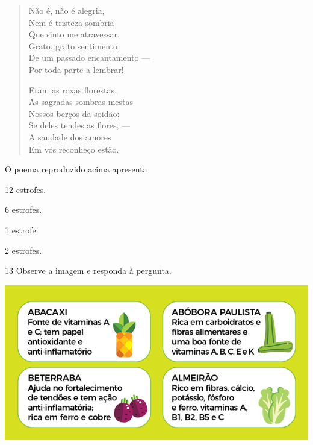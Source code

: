 \begin{myquote}
\begin{myescolha}
\begin{myquote}
\begin{verse}
Não é, não é alegria,\\
Nem é tristeza sombria\\
Que sinto me atravessar.\\
Grato, grato sentimento\\
De um passado encantamento ---\\
Por toda parte a lembrar!

Eram as roxas florestas,\\
As sagradas sombras mestas\\
Nossos berços da soidão:\\
Se deles tendes as flores, ---\\
A saudade dos amores\\
Em vós reconheço estão.
\end{verse}

\end{myquote}

O poema reproduzido acima apresenta

\begin{escolha}
  \item 12 estrofes.

  \item 6 estrofes.

  \item 1 estrofe.

  \item 2 estrofes.
\end{escolha}


\num{13} Observe a imagem e responda à pergunta.

\begin{myquote}

\includegraphics[width=\textwidth]{./imgQ4PORT/media/image4.png}



\end{myquote}
\end{myescolha}
\end{myquote}
